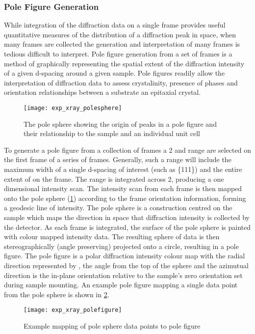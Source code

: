 \subsubsection{Pole Figure Generation}
While integration of the diffraction data on a single frame provides useful quantitative measures of the distribution of a diffraction peak in space, when many frames are collected the generation and interpretation of many frames is tedious difficult to interpret. Pole figure generation from a set of frames is a method of graphically representing the spatial extent of the diffraction intensity of a given d-spacing around a given sample. Pole figures readily allow the interpretation of diffraction data to assess crystalinity, presence of phases and orientation relationships between a substrate an epitaxial crystal.
\begin{figure}
    \centering
    \texttt{[image: exp\_xray\_polesphere]}
    \caption{\label{fig:exp_xray_polesphere}The pole sphere showing the origin of peaks in a pole figure and their relationship to the sample and an individual unit cell\cite{gadds_manual}}
\end{figure}

To generate a pole figure from a collection of frames a 2\texttheta{} and \textchi{} range are selected on the first frame of a series of frames. Generally, such a range will include the maximum width of a single d-spacing of interest (such as \{111\}) and the entire extent of \textchi{} on the frame. The range is integrated across 2\texttheta{}, producing a one dimensional intensity scan. The intensity scan from each frame is then mapped onto the pole sphere (\cref{fig:exp_xray_polesphere}) according to the frame orientation information, forming a geodesic line of intensity. The pole sphere is a construction centred on the sample which maps the direction in space that diffraction intensity is collected by the detector. As each frame is integrated, the surface of the pole sphere is painted with colour mapped intensity data. The resulting sphere of data is then stereographically (angle preserving) projected onto a circle, resulting in a pole figure. The pole figure is a polar diffraction intensity colour map with the radial direction represented by \textalpha{}, the angle from the top of the sphere and the azimutual direction \textphi{} is the in-plane orientation relative to the sample's \textphi{} zero orientation set during sample mounting. An example pole figure mapping a single data point from the pole sphere is shown in \cref{fig:exp_xray_polefigure}. 
\begin{figure}
    \centering
    \texttt{[image: exp\_xray\_polefigure]}
    \caption{\label{fig:exp_xray_polefigure}Example mapping of pole sphere data points to pole figure\cite{bobhe}}
\end{figure}

